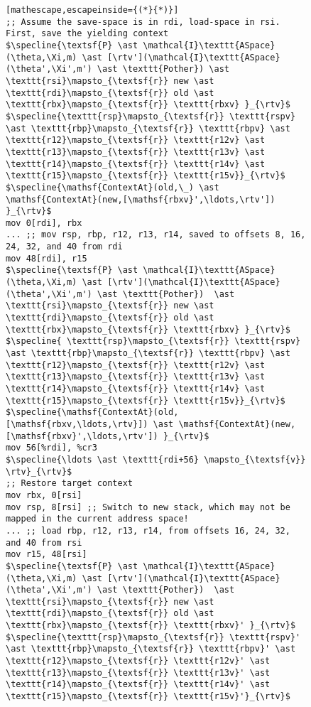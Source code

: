 \begin{figure}\footnotesize
\begin{lstlisting}[mathescape,escapeinside={(*}{*)}]
;; Assume the save-space is in rdi, load-space in rsi. First, save the yielding context
$\specline{\textsf{P} \ast \mathcal{I}\texttt{ASpace}(\theta,\Xi,m) \ast [\rtv'](\mathcal{I}\texttt{ASpace}(\theta',\Xi',m') \ast \texttt{Pother}) \ast \texttt{rsi}\mapsto_{\textsf{r}} new \ast \texttt{rdi}\mapsto_{\textsf{r}} old \ast \texttt{rbx}\mapsto_{\textsf{r}} \texttt{rbxv} }_{\rtv}$
$\specline{\texttt{rsp}\mapsto_{\textsf{r}} \texttt{rspv} \ast \texttt{rbp}\mapsto_{\textsf{r}} \texttt{rbpv} \ast \texttt{r12}\mapsto_{\textsf{r}} \texttt{r12v} \ast \texttt{r13}\mapsto_{\textsf{r}} \texttt{r13v} \ast \texttt{r14}\mapsto_{\textsf{r}} \texttt{r14v} \ast \texttt{r15}\mapsto_{\textsf{r}} \texttt{r15v}}_{\rtv}$
$\specline{\mathsf{ContextAt}(old,\_) \ast \mathsf{ContextAt}(new,[\mathsf{rbxv}',\ldots,\rtv']) }_{\rtv}$
mov 0[rdi], rbx
... ;; mov rsp, rbp, r12, r13, r14, saved to offsets 8, 16, 24, 32, and 40 from rdi
mov 48[rdi], r15
$\specline{\textsf{P} \ast \mathcal{I}\texttt{ASpace}(\theta,\Xi,m) \ast [\rtv'](\mathcal{I}\texttt{ASpace}(\theta',\Xi',m') \ast \texttt{Pother})  \ast  \texttt{rsi}\mapsto_{\textsf{r}} new \ast \texttt{rdi}\mapsto_{\textsf{r}} old \ast \texttt{rbx}\mapsto_{\textsf{r}} \texttt{rbxv} }_{\rtv}$
$\specline{ \texttt{rsp}\mapsto_{\textsf{r}} \texttt{rspv} \ast \texttt{rbp}\mapsto_{\textsf{r}} \texttt{rbpv} \ast \texttt{r12}\mapsto_{\textsf{r}} \texttt{r12v} \ast \texttt{r13}\mapsto_{\textsf{r}} \texttt{r13v} \ast \texttt{r14}\mapsto_{\textsf{r}} \texttt{r14v} \ast \texttt{r15}\mapsto_{\textsf{r}} \texttt{r15v}}_{\rtv}$
$\specline{\mathsf{ContextAt}(old,[\mathsf{rbxv,\ldots,\rtv}]) \ast \mathsf{ContextAt}(new,[\mathsf{rbxv}',\ldots,\rtv']) }_{\rtv}$
mov 56[%rdi], %cr3
$\specline{\ldots \ast \texttt{rdi+56} \mapsto_{\textsf{v}} \rtv}_{\rtv}$    
;; Restore target context
mov rbx, 0[rsi] 
mov rsp, 8[rsi] ;; Switch to new stack, which may not be mapped in the current address space!
... ;; load rbp, r12, r13, r14, from offsets 16, 24, 32, and 40 from rsi
mov r15, 48[rsi]
$\specline{\textsf{P} \ast \mathcal{I}\texttt{ASpace}(\theta,\Xi,m) \ast [\rtv'](\mathcal{I}\texttt{ASpace}(\theta',\Xi',m') \ast \texttt{Pother})  \ast  \texttt{rsi}\mapsto_{\textsf{r}} new \ast \texttt{rdi}\mapsto_{\textsf{r}} old \ast \texttt{rbx}\mapsto_{\textsf{r}} \texttt{rbxv}' }_{\rtv}$
$\specline{\texttt{rsp}\mapsto_{\textsf{r}} \texttt{rspv}' \ast \texttt{rbp}\mapsto_{\textsf{r}} \texttt{rbpv}' \ast \texttt{r12}\mapsto_{\textsf{r}} \texttt{r12v}' \ast \texttt{r13}\mapsto_{\textsf{r}} \texttt{r13v}' \ast \texttt{r14}\mapsto_{\textsf{r}} \texttt{r14v}' \ast \texttt{r15}\mapsto_{\textsf{r}} \texttt{r15v}'}_{\rtv}$

\end{lstlisting}
\end{figure}
